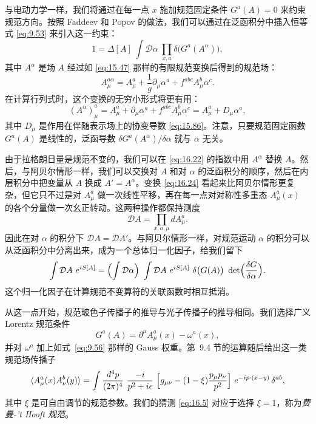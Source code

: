 与电动力学一样，我们将通过在每一点 $x$ 施加规范固定条件 $G^a(A) = 0$ 来约束规范方向。按照 Faddeev 和 Popov 的做法，我们可以通过在泛函积分中插入恒等式 \eqref{eq:9.53} 来引入这一约束：
\begin{equation}
  1 = \Delta[A]\ \int \mathcal{D}\alpha\ \prod_{x,a} \delta\bigl( G^a(A^\alpha)
    \bigr) ,
  \label{eq:16.23}
\end{equation}
其中 $A^\alpha$ 是场 $A$ 经过如 \eqref{eq:15.47} 那样的有限规范变换后得到的规范场：
\begin{equation}
  A^{a\alpha}_\mu = A^a_\mu + \frac{1}{g}\partial_\mu\alpha^a
    + f^{abc}A^b_\mu\alpha^c .
  \label{eq:16.24}
\end{equation}
在计算行列式时，这个变换的无穷小形式将更有用：
\begin{equation}
  (A^\alpha)^a_\mu = A^a_\mu + \partial_\mu\alpha^a + f^{abc}A^b_\mu\alpha^c
  = A^a_\mu + D_\mu\alpha^a ,
  \label{eq:16.25}
\end{equation}
其中 $D_\mu$ 是作用在伴随表示场上的协变导数 \eqref{eq:15.86}。注意，只要规范固定函数 $G^a(A)$ 是线性的，泛函导数 $\delta G^a(A^\alpha)/\delta\alpha$ 就与 $\alpha$ 无关。

由于拉格朗日量是规范不变的，我们可以在 \eqref{eq:16.22} 的指数中用 $A^\alpha$ 替换 $A$。然后，与阿贝尔情形一样，我们可以交换对 $A$ 和对 $\alpha$ 的泛函积分的顺序，然后在内层积分中把变量从 $A$ 换成 $A' = A^\alpha$。变换 \eqref{eq:16.24} 看起来比阿贝尔情形更复杂，但它只不过是对 $A^a_\mu$ 做一次线性平移，再在每一点对对称性多重态 $A^a_\mu(x)$ 的各个分量做一次幺正转动。这两种操作都保持测度
\begin{equation}
  \mathcal{D}A = \prod_{x,a,\mu} dA^a_\mu .
  \label{eq:16.26}
\end{equation}
因此在对 $\alpha$ 的积分下 $\mathcal{D}A = \mathcal{D}A'$。与阿贝尔情形一样，对规范运动 $\alpha$ 的积分可以从泛函积分中分离出来，成为一个总体归一化因子，给我们留下
\begin{equation}
  \int \mathcal{D}A\ e^{iS[A]} = \Bigl( \int \mathcal{D}\alpha \Bigr)\
    \int \mathcal{D}A\ e^{iS[A]}\ \delta\bigl( G(A) \bigr)\ \det\Bigl(
      \frac{\delta G}{\delta\alpha} \Bigr) .
  \label{eq:16.27}
\end{equation}
这个归一化因子在计算规范不变算符的关联函数时相互抵消。

从这一点开始，规范玻色子传播子的推导与光子传播子的推导相同。我们选择广义 Lorentz 规范条件
\begin{equation}
  G^a(A) = \partial^\mu A^a_\mu(x) - \omega^a(x) ,
  \label{eq:16.28}
\end{equation}
并对 $\omega^a$ 加上如式~\eqref{eq:9.56} 那样的 Gauss 权重。第~9.4 节的运算随后给出这一类规范场传播子
\begin{equation}
  \langle A^a_\mu(x)A^b_\nu(y)\rangle = \int \frac{d^4p}{(2\pi)^4}\
    \frac{-i}{p^2+i\epsilon}\ \Bigl[ g_{\mu\nu} - (1-\xi)\frac{p_\mu p_\nu}
      {p^2} \Bigr]\ e^{-ip\cdot(x-y)}\,\delta^{ab} ,
  \label{eq:16.29}
\end{equation}
其中 $\xi$ 是可自由调节的规范参数。我们的猜测 \eqref{eq:16.5} 对应于选择 $\xi = 1$，称为\emph{费曼-'t Hooft 规范}。

